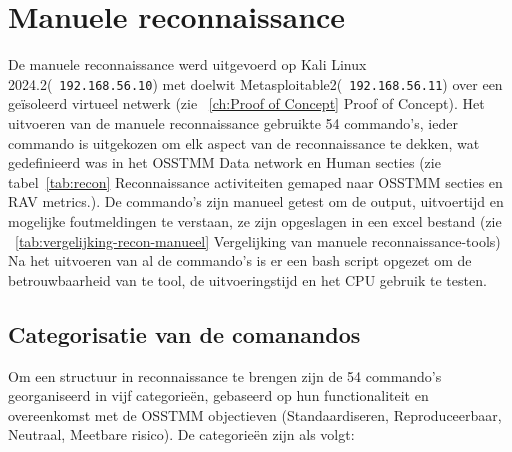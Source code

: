 \section{Manuele reconnaissance}
De manuele reconnaissance werd uitgevoerd op Kali Linux 2024.2(~\texttt{192.168.56.10}) met doelwit Metasploitable2(~\texttt{192.168.56.11}) over een geïsoleerd virtueel netwerk (zie ~\ref{ch:Proof of Concept} Proof of Concept).
Het uitvoeren van de manuele reconnaissance gebruikte 54 commando's, ieder commando is uitgekozen om elk aspect van de reconnaissance te dekken, wat gedefinieerd was in het OSSTMM Data network en Human secties (zie tabel~\ref{tab:recon} Reconnaissance activiteiten gemaped naar OSSTMM secties en RAV metrics.).
De commando's zijn manueel getest om de output, uitvoertijd en mogelijke foutmeldingen te verstaan, ze zijn opgeslagen in een excel bestand (zie ~\ref{tab:vergelijking-recon-manueel} Vergelijking van manuele reconnaissance-tools)
Na het uitvoeren van al de commando's is er een bash script opgezet om de betrouwbaarheid van te tool, de uitvoeringstijd en het CPU gebruik te testen.

\subsection{Categorisatie van de comanandos}

Om een structuur in reconnaissance te brengen zijn de 54 commando's georganiseerd in vijf categorieën, gebaseerd op hun functionaliteit en overeenkomst met de OSSTMM objectieven (Standaardiseren, Reproduceerbaar, Neutraal, Meetbare risico).
De categorieën zijn als volgt:

